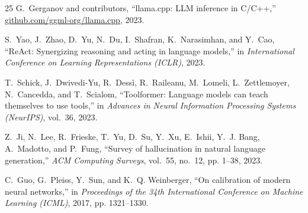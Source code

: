 \documentclass[conference]{IEEEtran}
\begin{document}
\begin{thebibliography}{25}
G.~Gerganov and contributors, ``llama.cpp: {LLM} inference in {C/C++},''
  \url{github.com/ggml-org/llama.cpp}, 2023.

S.~Yao, J.~Zhao, D.~Yu, N.~Du, I.~Shafran, K.~Narasimhan, and Y.~Cao,
  ``{ReAct}: Synergizing reasoning and acting in language models,'' in
  \emph{International Conference on Learning Representations (ICLR)}, 2023.

T.~Schick, J.~Dwivedi-Yu, R.~Dess{\`i}, R.~Raileanu, M.~Lomeli, L.~Zettlemoyer,
  N.~Cancedda, and T.~Scialom, ``Toolformer: Language models can teach
  themselves to use tools,'' in \emph{Advances in Neural Information Processing
  Systems (NeurIPS)}, vol.~36, 2023.

Z.~Ji, N.~Lee, R.~Frieske, T.~Yu, D.~Su, Y.~Xu, E.~Ishii, Y.~J. Bang,
  A.~Madotto, and P.~Fung, ``Survey of hallucination in natural language
  generation,'' \emph{ACM Computing Surveys}, vol.~55, no.~12, pp. 1--38, 2023.

C.~Guo, G.~Pleiss, Y.~Sun, and K.~Q. Weinberger, ``On calibration of modern
  neural networks,'' in \emph{Proceedings of the 34th International Conference
  on Machine Learning (ICML)}, 2017, pp. 1321--1330.

\end{thebibliography}
\end{document}
